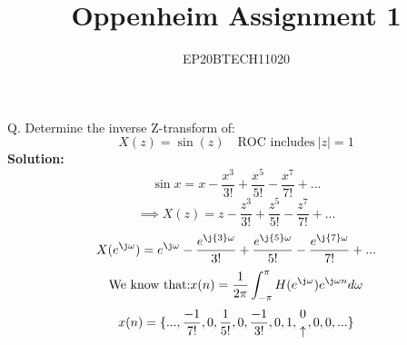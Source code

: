 \documentclass[journal,12pt,twocolumn]{IEEEtran}
\title{ Oppenheim Assignment 1}
\author{ EP20BTECH11020 }
\newcommand{\solution}{\noindent \textbf{Solution: }}
\newcommand{\nobarfrac}{\genfrac{}{}{0pt}{}}
\begin{document}
	\maketitle
	
Q. Determine the inverse Z-transform of:
\begin{equation}
	X(z) = \sin(z) \quad \text{ROC includes}\ |z| = 1
\end{equation}
\solution
\begin{equation}
	\sin{x} = x - \frac{x^{3}}{3!} + \frac{x^{5}}{5!} - \frac{x^{7}}{7!} + ...
\end{equation}
\begin{equation}
	\implies X(z) = z - \frac{z^{3}}{3!} + \frac{z^{5}}{5!} - \frac{z^{7}}{7!} + ...
\end{equation}
\begin{equation}
	X(e^{\j\omega}) = e^{\j\omega} - \frac{e^{\j{3}\omega}}{3!} + \frac{e^{\j{5}\omega}}{5!} - \frac{e^{\j{7}\omega}}{7!} + ...
\end{equation}
\begin{equation}
	\text{We know that:} x(n) = \frac{1}{2\pi}\int_{-\pi}^{\pi}H(e^{\j\omega})e^{\j\omega{n}}d\omega
\end{equation}
\begin{equation}
	x(n) = \{...,\frac{-1}{7!},0,\frac{1}{5!},0,\frac{-1}{3!},0,1,\nobarfrac{0}{\uparrow},0,0,...\}
\end{equation}
\end{document}
